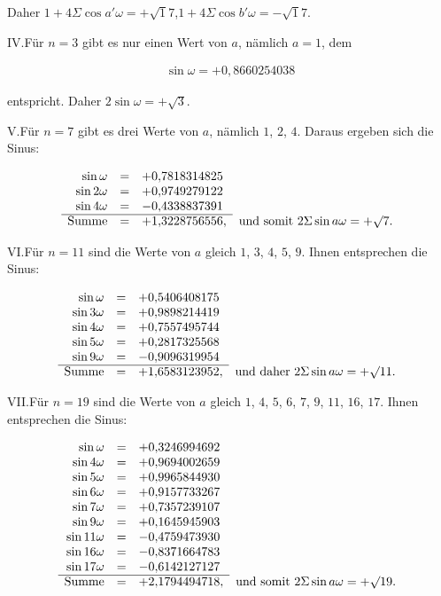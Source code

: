 Daher $1+4\Sigma\cos a'\omega=+\surd17$,\quad $1+4\Sigma\cos b'\omega=-\surd17$.

IV.\quad Für $n=3$ gibt es nur einen Wert von $a$, nämlich $a=1$, dem

\[
\begin{aligned}
\sin\omega=+0{,}8660254038
\end{aligned}
\]

entspricht. Daher $2\sin\omega=+\surd3$.

V.\quad Für $n=7$ gibt es drei Werte von $a$, nämlich $1$, $2$, $4$. Daraus ergeben sich die Sinus:

{\small\setlength{\arraycolsep}{2.5pt}\renewcommand{\arraystretch}{1.15}
\[
\begin{array}{rcll}
\sin\omega&=&+0{,}7818314825&\\
\sin2\omega&=&+0{,}9749279122&\\
\sin4\omega&=&-0{,}4338837391&\\\cline{1-3}
\text{Summe}&=&+1{,}3228756556,&\text{und somit }2\Sigma\sin a\omega=+\surd7.
\end{array}
\]
}

VI.\quad Für $n=11$ sind die Werte von $a$ gleich $1$, $3$, $4$, $5$, $9$. Ihnen entsprechen die Sinus:

{\small\setlength{\arraycolsep}{2.5pt}\renewcommand{\arraystretch}{1.15}
\[
\begin{array}{rcll}
\sin\omega&=&+0{,}5406408175&\\
\sin3\omega&=&+0{,}9898214419&\\
\sin4\omega&=&+0{,}7557495744&\\
\sin5\omega&=&+0{,}2817325568&\\
\sin9\omega&=&-0{,}9096319954&\\\cline{1-3}
\text{Summe}&=&+1{,}6583123952,&\text{und daher }2\Sigma\sin a\omega=+\surd11.
\end{array}
\]
}

VII.\quad Für $n=19$ sind die Werte von $a$ gleich $1$, $4$, $5$, $6$, $7$, $9$, $11$, $16$, $17$. Ihnen entsprechen die Sinus:

{\small\setlength{\arraycolsep}{2.5pt}\renewcommand{\arraystretch}{1.15}
\[
\begin{array}{rcll}
\sin\omega&=&+0{,}3246994692&\\
\sin4\omega&=&+0{,}9694002659&\\
\sin5\omega&=&+0{,}9965844930&\\
\sin6\omega&=&+0{,}9157733267&\\
\sin7\omega&=&+0{,}7357239107&\\
\sin9\omega&=&+0{,}1645945903&\\
\sin11\omega&=&-0{,}4759473930&\\
\sin16\omega&=&-0{,}8371664783&\\
\sin17\omega&=&-0{,}6142127127&\\\cline{1-3}
\text{Summe}&=&+2{,}1794494718,&\text{und somit }2\Sigma\sin a\omega=+\surd19.
\end{array}
\]
}

